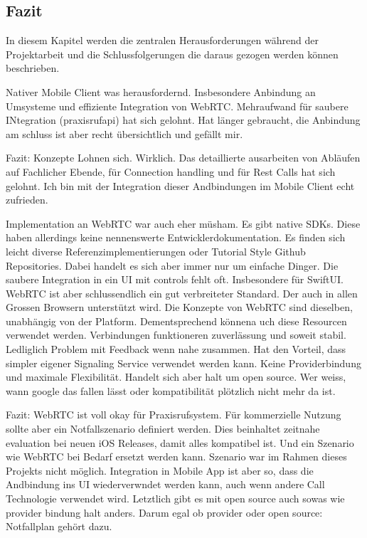 \subsection{Fazit}

In diesem Kapitel werden die zentralen Herausforderungen während der Projektarbeit und die Schlussfolgerungen die daraus gezogen werden können beschrieben.

Nativer Mobile Client was herausfordernd.
Insbesondere Anbindung an Umsysteme und effiziente Integration von WebRTC.
Mehraufwand für saubere INtegration (praxisrufapi) hat sich gelohnt.
Hat länger gebraucht, die Anbindung am schluss ist aber recht übersichtlich und gefällt mir.

Fazit: Konzepte Lohnen sich.
Wirklich.
Das detaillierte ausarbeiten von Abläufen auf Fachlicher Ebende, für Connection handling und für Rest Calls hat sich gelohnt.
Ich bin mit der Integration dieser Andbindungen im Mobile Client echt zufrieden.

Implementation an WebRTC war auch eher müsham.
Es gibt native SDKs.
Diese haben allerdings keine nennenswerte Entwicklerdokumentation.
Es finden sich leicht diverse Referenzimplementierungen oder Tutorial Style Github Repositories.
Dabei handelt es sich aber immer nur um einfache Dinger.
Die saubere Integration in ein UI mit controls fehlt oft.
Insbesondere für SwiftUI.
WebRTC ist aber schlussendlich ein gut verbreiteter Standard.
Der auch in allen Grossen Browsern unterstützt wird.
Die Konzepte von WebRTC sind dieselben, unabhängig von der Platform.
Dementsprechend könnena uch diese Resourcen verwendet werden.
Verbindungen funktioneren zuverlässung und soweit stabil.
Ledliglich Problem mit Feedback wenn nahe zusammen.
Hat den Vorteil, dass simpler eigener Signaling Service verwendet werden kann.
Keine Providerbindung und maximale Flexibilität.
Handelt sich aber halt um open source.
Wer weiss, wann google das fallen lässt oder kompatibilität plötzlich nicht mehr da ist.

Fazit: WebRTC ist voll okay für Praxisrufsystem.
Für kommerzielle Nutzung sollte aber ein Notfallszenario definiert werden.
Dies beinhaltet zeitnahe evaluation bei neuen iOS Releases, damit alles kompatibel ist.
Und ein Szenario wie WebRTC bei Bedarf ersetzt werden kann.
Szenario war im Rahmen dieses Projekts nicht möglich.
Integration in Mobile App ist aber so, dass die Andbindung ins UI wiederverwndet werden kann, auch wenn andere Call Technologie verwendet wird.
Letztlich gibt es mit open source auch sowas wie provider bindung halt anders.
Darum egal ob provider oder open source: Notfallplan gehört dazu.


